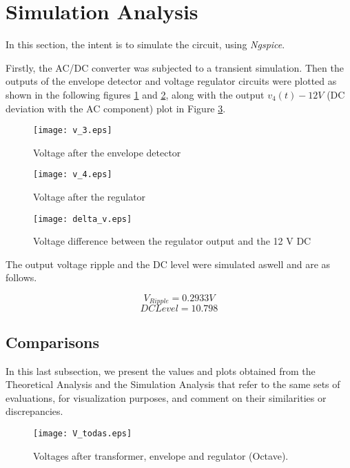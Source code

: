\section{Simulation Analysis}
\label{sec:simulation}

In this section, the intent is to simulate the circuit, using \textit{Ngspice}.

Firstly, the AC/DC converter was subjected to a transient simulation. Then the outputs of the envelope detector and voltage regulator circuits were plotted as shown in the following figures \ref{plot5} and \ref{plot6}, along with the output $v_4(t)-12V$ (DC deviation with the AC component) plot in Figure \ref{plot7}. 

\begin{figure}[h]
    \centering
    \texttt{[image: v\_3.eps]}
    \caption{Voltage after the envelope detector}
    \label{plot5}
\end{figure}

\begin{figure}[h]
    \centering
    \texttt{[image: v\_4.eps]}
    \caption{Voltage after the regulator}
    \label{plot6}
\end{figure}

\begin{figure}[h]
\centering
\texttt{[image: delta\_v.eps]}
\caption{Voltage difference between the regulator output and the 12 V DC}
\label{plot7}
\end{figure}
\clearpage

The output voltage ripple and the DC level were simulated aswell and are as follows.

\begin{equation}
    V_{Ripple} = 0.2933 V
\end{equation}
\begin{equation}
    DC Level = 10.798
\end{equation}


\subsection{Comparisons}
\label{subsec:compare}

In this last subsection, we present the values and plots obtained from the Theoretical Analysis and the Simulation Analysis that refer to the same sets of evaluations, for visualization purposes, and comment on their similarities or discrepancies.

\begin{figure}[ht]
\centering
\texttt{[image: V\_todas.eps]}
\caption{Voltages after transformer, envelope and regulator (Octave).}
\end{figure}


